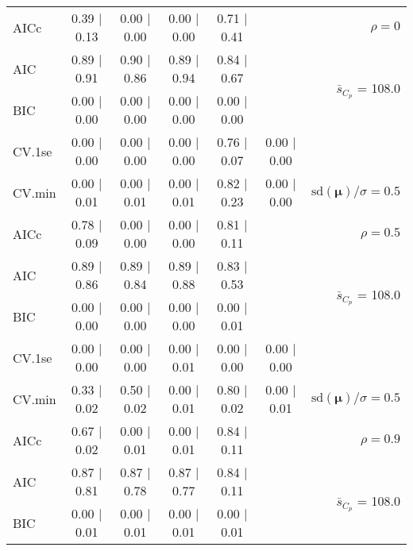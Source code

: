 \documentclass[12pt]{article}
\newcommand{\mr}[1]{\mathrm{#1}}
\newcommand{\bm}[1]{\mathbf{#1}}
\begin{document}
\begin{table}[p]
\begin{center}
\begin{tabular}{l*{5}{c}|r}
AICc & 0.39 $\mid$ 0.13 & 0.00 $\mid$ 0.00 & 0.00 $\mid$ 0.00 & 0.71 $\mid$ 0.41 & & $\rho=0$ \\
AIC & 0.89 $\mid$ 0.91 & 0.90 $\mid$ 0.86 & 0.89 $\mid$ 0.94 & 0.84 $\mid$ 0.67 & & \multirow{2}{*}{$\bar{s}_{C_p}$ = 108.0} \\
BIC & 0.00 $\mid$ 0.00 & 0.00 $\mid$ 0.00 & 0.00 $\mid$ 0.00 & 0.00 $\mid$ 0.00 & & \\
 \hline 
CV.1se & 0.00 $\mid$ 0.00 & 0.00 $\mid$ 0.00 & 0.00 $\mid$ 0.00 & 0.76 $\mid$ 0.07 & 0.00 $\mid$ 0.00 &\\
CV.min & 0.00 $\mid$ 0.01 & 0.00 $\mid$ 0.01 & 0.00 $\mid$ 0.01 & 0.82 $\mid$ 0.23 & 0.00 $\mid$ 0.00 &  $\mr{sd}(\bm{\mu})/\sigma=0.5$ \\
AICc & 0.78 $\mid$ 0.09 & 0.00 $\mid$ 0.00 & 0.00 $\mid$ 0.00 & 0.81 $\mid$ 0.11 & & $\rho=0.5$ \\
AIC & 0.89 $\mid$ 0.86 & 0.89 $\mid$ 0.84 & 0.89 $\mid$ 0.88 & 0.83 $\mid$ 0.53 & & \multirow{2}{*}{$\bar{s}_{C_p}$ = 108.0} \\
BIC & 0.00 $\mid$ 0.00 & 0.00 $\mid$ 0.00 & 0.00 $\mid$ 0.00 & 0.00 $\mid$ 0.01 & & \\
 \hline 
CV.1se & 0.00 $\mid$ 0.00 & 0.00 $\mid$ 0.00 & 0.00 $\mid$ 0.01 & 0.00 $\mid$ 0.00 & 0.00 $\mid$ 0.00 &\\
CV.min & 0.33 $\mid$ 0.02 & 0.50 $\mid$ 0.02 & 0.00 $\mid$ 0.01 & 0.80 $\mid$ 0.02 & 0.00 $\mid$ 0.01 &  $\mr{sd}(\bm{\mu})/\sigma=0.5$ \\
AICc & 0.67 $\mid$ 0.02 & 0.00 $\mid$ 0.01 & 0.00 $\mid$ 0.01 & 0.84 $\mid$ 0.11 & & $\rho=0.9$ \\
AIC & 0.87 $\mid$ 0.81 & 0.87 $\mid$ 0.78 & 0.87 $\mid$ 0.77 & 0.84 $\mid$ 0.11 & & \multirow{2}{*}{$\bar{s}_{C_p}$ = 108.0} \\
BIC & 0.00 $\mid$ 0.01 & 0.00 $\mid$ 0.01 & 0.00 $\mid$ 0.01 & 0.00 $\mid$ 0.01 & & \\
 \hline 
 \end{tabular}
\end{center}
\vspace{-1cm}
\end{table}
\end{document}
